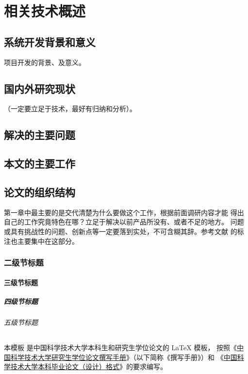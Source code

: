 
\chapter{相关技术概述}

\section{系统开发背景和意义}
项目开发的背景、及意义。
\section{国内外研究现状}
（一定要立足于技术，最好有归纳和分析）。
\section{解决的主要问题}

\section{本文的主要工作}

\section{论文的组织结构}
第一章中最主要的是交代清楚为什么要做这个工作，根据前面调研内容才能
得出自己的工作究竟特色在哪？立足于解决以前产品所没有、或者不足的地方。
问题或具有挑战性的问题、创新点等一定要落到实处，不可含糊其辞。参考文献
的标注也主要集中在这部分。


\subsection{二级节标题}

\subsubsection{三级节标题}

\paragraph{四级节标题}

\subparagraph{五级节标题}

本模板  是中国科学技术大学本科生和研究生学位论文的 \LaTeX{}
模板， 按照《\href{https://gradschool.ustc.edu.cn/static/upload/article/picture/ce3b02e5f0274c90b9331ef50ae1ac26.pdf}
{中国科学技术大学研究生学位论文撰写手册}》（以下简称《撰写手册》）和
《\href{https://www.teach.ustc.edu.cn/?attachment_id=13867}
{中国科学技术大学本科毕业论文（设计）格式}》的要求编写。

